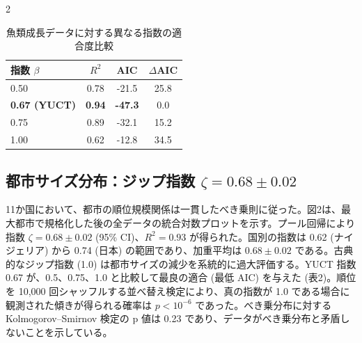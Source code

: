 \documentclass[11pt,a4paper]{article}
\begin{document}
\begin{multicols}{2}
		\begin{table}[htbp]
			\centering
			\caption{魚類成長データに対する異なる指数の適合度比較}
			\label{tab:comparison_fish}
			\begin{tabular}{lccc}
				\toprule
				\textbf{指数 \(\beta\)} & \(R^2\) & AIC & \(\Delta\)AIC \\
				\midrule
				0.50 & 0.78 & -21.5 & 25.8 \\
				\textbf{0.67 (YUCT)} & \textbf{0.94} & \textbf{-47.3} & 0.0 \\
				0.75 & 0.89 & -32.1 & 15.2 \\
				1.00 & 0.62 & -12.8 & 34.5 \\
				\bottomrule
			\end{tabular}
		\end{table}
		
		\subsection{都市サイズ分布：ジップ指数 \(\zeta = 0.68 \pm 0.02\)}
		
		11か国において、都市の順位規模関係は一貫したべき乗則に従った。図2は、最大都市で規格化した後の全データの統合対数プロットを示す。プール回帰により指数 \(\zeta = 0.68 \pm 0.02\) (95\% CI)、\(R^2 = 0.93\) が得られた。国別の指数は 0.62 (ナイジェリア) から 0.74 (日本) の範囲であり、加重平均は \(0.68 \pm 0.02\) である。古典的なジップ指数 (1.0) は都市サイズの減少を系統的に過大評価する。YUCT 指数 0.67 が、0.5、0.75、1.0 と比較して最良の適合 (最低 AIC) を与えた (表2)。順位を 10,000 回シャッフルする並べ替え検定により、真の指数が 1.0 である場合に観測された傾きが得られる確率は \(p < 10^{-6}\) であった。べき乗分布に対する Kolmogorov–Smirnov 検定の p 値は 0.23 であり、データがべき乗分布と矛盾しないことを示している。
		

\end{multicols}
\end{document}
